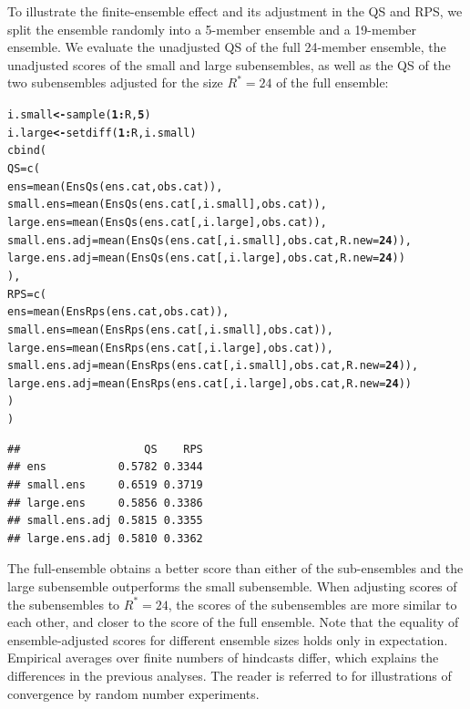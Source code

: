\documentclass[10pt]{article}\usepackage[]{graphicx}\usepackage[]{color}
\makeatletter
\newcommand{\hlnum}[1]{\textcolor[rgb]{0.502,0,0.502}{\textbf{#1}}}%
\newcommand{\hlopt}[1]{\textcolor[rgb]{1,0,0.502}{\textbf{#1}}}%
\newcommand{\hlstd}[1]{\textcolor[rgb]{0,0,0}{#1}}%
\newcommand{\hlkwb}[1]{\textcolor[rgb]{0.502,0.502,0.753}{\textbf{#1}}}%
\newcommand{\hlkwc}[1]{\textcolor[rgb]{0,0.502,0.753}{#1}}%
\newcommand{\hlkwd}[1]{\textcolor[rgb]{0,0.267,0.4}{#1}}%
\newenvironment{kframe}{%
 \def\at@end@of@kframe{}%
 \ifinner\ifhmode%
  \def\at@end@of@kframe{\end{minipage}}%
  \begin{minipage}{\columnwidth}%
 \fi\fi%
 \def\FrameCommand##1{\hskip\@totalleftmargin \hskip-\fboxsep
 \colorbox{shadecolor}{##1}\hskip-\fboxsep
     \hskip-\linewidth \hskip-\@totalleftmargin \hskip\columnwidth}%
 \MakeFramed {\advance\hsize-\width
   \@totalleftmargin\z@ \linewidth\hsize
   \@setminipage}}%
 {\par\unskip\endMakeFramed%
 \at@end@of@kframe}
\newenvironment{knitrout}{}{} %
\makeatother
\begin{document}
To illustrate the finite-ensemble effect and its adjustment in the QS and RPS, we split the ensemble randomly into a 5-member ensemble and a 19-member ensemble. 
We evaluate the unadjusted QS of the full 24-member ensemble, the unadjusted scores of the small and large subensembles, as well as the QS of the two subensembles adjusted for the size $R^*=24$ of the full ensemble:
%
\begin{knitrout}
\color{fgcolor}\begin{kframe}
\begin{alltt}
\hlstd{i.small} \hlkwb{<-} \hlkwd{sample}\hlstd{(}\hlnum{1}\hlopt{:}\hlstd{R,} \hlnum{5}\hlstd{)}
\hlstd{i.large} \hlkwb{<-} \hlkwd{setdiff}\hlstd{(}\hlnum{1}\hlopt{:}\hlstd{R, i.small)}
\hlkwd{cbind}\hlstd{(}
 \hlkwc{QS} \hlstd{=} \hlkwd{c}\hlstd{(}
  \hlkwc{ens}           \hlstd{=} \hlkwd{mean}\hlstd{(}\hlkwd{EnsQs}\hlstd{(ens.cat,            obs.cat)),}
  \hlkwc{small.ens}     \hlstd{=} \hlkwd{mean}\hlstd{(}\hlkwd{EnsQs}\hlstd{(ens.cat[, i.small], obs.cat)),}
  \hlkwc{large.ens}     \hlstd{=} \hlkwd{mean}\hlstd{(}\hlkwd{EnsQs}\hlstd{(ens.cat[, i.large], obs.cat)),}
  \hlkwc{small.ens.adj} \hlstd{=} \hlkwd{mean}\hlstd{(}\hlkwd{EnsQs}\hlstd{(ens.cat[, i.small], obs.cat,} \hlkwc{R.new}\hlstd{=}\hlnum{24}\hlstd{)),}
  \hlkwc{large.ens.adj} \hlstd{=} \hlkwd{mean}\hlstd{(}\hlkwd{EnsQs}\hlstd{(ens.cat[, i.large], obs.cat,} \hlkwc{R.new}\hlstd{=}\hlnum{24}\hlstd{))}
 \hlstd{),}
 \hlkwc{RPS} \hlstd{=} \hlkwd{c}\hlstd{(}
  \hlkwc{ens}           \hlstd{=} \hlkwd{mean}\hlstd{(}\hlkwd{EnsRps}\hlstd{(ens.cat,            obs.cat)),}
  \hlkwc{small.ens}     \hlstd{=} \hlkwd{mean}\hlstd{(}\hlkwd{EnsRps}\hlstd{(ens.cat[, i.small], obs.cat)),}
  \hlkwc{large.ens}     \hlstd{=} \hlkwd{mean}\hlstd{(}\hlkwd{EnsRps}\hlstd{(ens.cat[, i.large], obs.cat)),}
  \hlkwc{small.ens.adj} \hlstd{=} \hlkwd{mean}\hlstd{(}\hlkwd{EnsRps}\hlstd{(ens.cat[, i.small], obs.cat,} \hlkwc{R.new}\hlstd{=}\hlnum{24}\hlstd{)),}
  \hlkwc{large.ens.adj} \hlstd{=} \hlkwd{mean}\hlstd{(}\hlkwd{EnsRps}\hlstd{(ens.cat[, i.large], obs.cat,} \hlkwc{R.new}\hlstd{=}\hlnum{24}\hlstd{))}
 \hlstd{)}
\hlstd{)}
\end{alltt}
\begin{verbatim}
##                   QS    RPS
## ens           0.5782 0.3344
## small.ens     0.6519 0.3719
## large.ens     0.5856 0.3386
## small.ens.adj 0.5815 0.3355
## large.ens.adj 0.5810 0.3362
\end{verbatim}
\end{kframe}
\end{knitrout}
%
The full-ensemble obtains a better score than either of the sub-ensembles and the large subensemble outperforms the small subensemble.
When adjusting scores of the subensembles to $R^*=24$, the scores of the subensembles are more similar to each other, and closer to the score of the full ensemble.
Note that the equality of ensemble-adjusted scores for different ensemble sizes holds only in expectation. 
Empirical averages over finite numbers of hindcasts differ, which explains the differences in the previous analyses.
The reader is referred to \citet{ferro2013fair} for illustrations of convergence by random number experiments.
\end{document}
